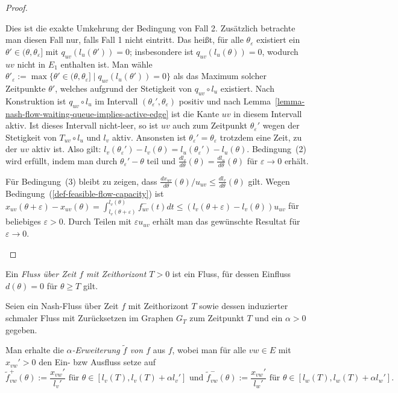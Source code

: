 \begin{proof}
\begin{description}
		Dies ist die exakte Umkehrung der Bedingung von Fall 2.
		Zusätzlich betrachte man diesen Fall nur, falls Fall 1 nicht eintritt.
		Das heißt, für alle $\theta_\varepsilon$ existiert ein $\theta'\in(\theta, \theta_\varepsilon]$ mit $q_{uv}(l_u(\theta')) = 0$; insbesondere ist $q_{uv}(l_u(\theta))= 0$, wodurch $uv$ nicht in $E_1$ enthalten ist.
		Man wähle $\theta'_\varepsilon:=\max\{ \theta'\in (\theta, \theta_\varepsilon] \mid q_{uv}(l_u(\theta')) = 0 \}$ als das Maximum solcher Zeitpunkte $\theta'$, welches aufgrund der Stetigkeit von $q_{uv}\circ l_u$ existiert.
		Nach Konstruktion ist $q_{uv}\circ l_u$ im Intervall $(\theta_\varepsilon', \theta_\varepsilon)$ positiv und nach Lemma~\ref{lemma-nash-flow-waiting-queue-implies-active-edge} ist die Kante $uv$ in diesem Intervall aktiv.
		Ist dieses Intervall nicht-leer, so ist $uv$ auch zum Zeitpunkt $\theta_\varepsilon'$ wegen der Stetigkeit von $T_{uv}\circ l_u$ und $l_v$ aktiv.
		Ansonsten ist $\theta_\varepsilon'=\theta_\varepsilon$ trotzdem eine Zeit, zu der $uv$ aktiv ist.
		Also gilt: $l_v(\theta_\varepsilon') - l_v(\theta) = l_u(\theta_\varepsilon') - l_u(\theta)$.
		Bedingung~(2) wird erfüllt, indem man durch $\theta_\varepsilon'-\theta$ teil und $\frac{dl_v}{d\theta}(\theta) = \frac{dl_u}{d\theta}(\theta)$ für $\varepsilon\rightarrow0$ erhält.
		
		Für Bedingung~(3) bleibt zu zeigen, dass $\frac{dx_{uv}}{d\theta}(\theta) /u_{uv}\leq \frac{dl_v}{d\theta}(\theta)$ gilt.
		Wegen Bedingung~(\ref{def-feasible-flow-capacity}) ist $x_{uv}(\theta + \varepsilon)-x_{uv}(\theta) = \int_{l_v(\theta+\varepsilon)}^{l_v(\theta)} f_{uv}^-(t) dt\leq (l_v(\theta + \varepsilon) - l_v(\theta)) u_{uv}$ für beliebiges $\varepsilon > 0$.
		Durch Teilen mit $\varepsilon u_{uv}$ erhält man das gewünschte Resultat für $\varepsilon \rightarrow 0$.
	\end{description}
\end{proof}

\begin{definition}
	Ein \emph{Fluss über Zeit $f$ mit Zeithorizont $T>0$} ist ein Fluss, für dessen Einfluss $d(\theta)= 0$ für $\theta\geq T$ gilt.
\end{definition}

\begin{definition}
	Seien ein Nash-Fluss über Zeit $f$ mit Zeithorizont $T$ sowie dessen induzierter schmaler Fluss mit Zurücksetzen im Graphen $G_T$ zum Zeitpunkt $T$ und ein $\alpha > 0$ gegeben.
	
	
	Man erhalte die \emph{$\alpha$-Erweiterung $\tilde{f}$ von $f$} aus $f$, wobei man für alle $vw\in E$ mit $x_{vw}'>0$ den Ein- bzw Ausfluss setze auf
	$$\tilde{f}_{vw}^+(\theta):= \frac{x_{vw}'}{l_v'} \text{ für $\theta\in [l_v(T), l_v(T)+\alpha l_v']$ und } \tilde{f}_{vw}^-(\theta):=\frac{x_{vw}'}{l_w'} \text{ für $\theta\in [l_w(T), l_w(T)+\alpha l_w']$.}$$
\end{definition}


